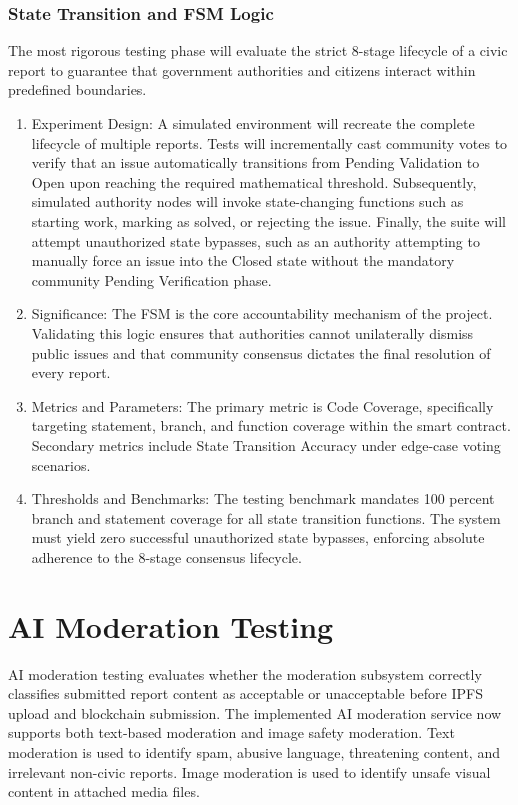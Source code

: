 \subsubsection{State Transition and \ac{FSM} Logic}
The most rigorous testing phase will evaluate the strict 8-stage lifecycle of a civic report to guarantee that government authorities and citizens interact within predefined boundaries.

\begin{enumerate}
    \item Experiment Design: A simulated environment will recreate the complete lifecycle of multiple reports. Tests will incrementally cast community votes to verify that an issue automatically transitions from Pending Validation to Open upon reaching the required mathematical threshold. Subsequently, simulated authority nodes will invoke state-changing functions such as starting work, marking as solved, or rejecting the issue. Finally, the suite will attempt unauthorized state bypasses, such as an authority attempting to manually force an issue into the Closed state without the mandatory community Pending Verification phase.
    \item Significance: The \ac{FSM} is the core accountability mechanism of the project. Validating this logic ensures that authorities cannot unilaterally dismiss public issues and that community consensus dictates the final resolution of every report.
    \item Metrics and Parameters: The primary metric is Code Coverage, specifically targeting statement, branch, and function coverage within the smart contract. Secondary metrics include State Transition Accuracy under edge-case voting scenarios.
    \item Thresholds and Benchmarks: The testing benchmark mandates 100 percent branch and statement coverage for all state transition functions. The system must yield zero successful unauthorized state bypasses, enforcing absolute adherence to the 8-stage consensus lifecycle.
\end{enumerate}

\section{AI Moderation Testing}



AI moderation testing evaluates whether the moderation subsystem correctly
classifies submitted report content as acceptable or unacceptable before IPFS
upload and blockchain submission. The implemented AI moderation service now
supports both text-based moderation and image safety moderation. Text moderation
is used to identify spam, abusive language, threatening content, and irrelevant
non-civic reports. Image moderation is used to identify unsafe visual content in
attached media files.

